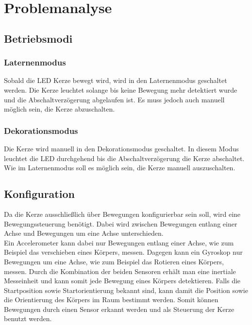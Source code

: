 \section{Problemanalyse}
    \subsection{Betriebsmodi}

        \subsubsection{Laternenmodus}
            Sobald die LED Kerze bewegt wird, wird in den Laternenmodus
            geschaltet werden. Die Kerze leuchtet solange bis keine Bewegung
            mehr detektiert wurde und die Abschaltverzögerung abgelaufen ist.
            Es muss jedoch auch manuell möglich sein, die Kerze abzuschalten.

        \subsubsection{Dekorationsmodus}
            Die Kerze wird manuell in den Dekorationsmodus geschaltet.
            In diesem Modus leuchtet die LED durchgehend bis die
            Abschaltverzögerung die Kerze abschaltet. Wie im
            Laternenmodus soll es möglich sein, die Kerze manuell auszuschalten.


    \subsection{Konfiguration}
        Da die Kerze ausschließlich über Bewegungen konfigurierbar sein soll,
        wird eine Bewegungssteuerung benötigt.
        Dabei wird zwischen Bewegungen entlang einer Achse und Bewegungen
        um eine Achse unterschieden.\\
        Ein Accelerometer kann dabei nur Bewegungen entlang einer Achse,
        wie zum Beispiel das verschieben eines Körpers, messen.
        Dagegen kann ein Gyroskop nur Bewegungen um eine Achse,
        wie zum Beispiel das Rotieren eines Körpers, messen.
        Durch die Kombination der beiden Sensoren erhält man eine
        inertiale Messeinheit und kann somit jede Bewegung eines Körpers
        detektieren. Falls die Startposition sowie Startorientierung bekannt sind,
        kann damit die Position sowie die Orientierung des Körpers im 
        Raum bestimmt werden.
        Somit können Bewegungen durch einen Sensor erkannt werden und als
        Steuerung der Kerze benutzt werden.

